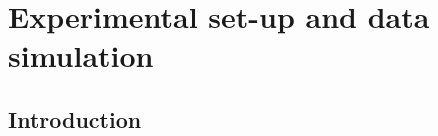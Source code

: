 %
%
%
%
%
	\chapter{Experimental set-up and data simulation}
  \label{chap:experimentalframework}
	\section{Introduction}

%		
		
